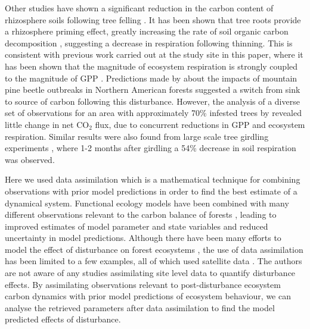 Other studies have shown a significant reduction in the carbon content of rhizosphere soils following tree felling \citep{Hernesmaa2005777}. It has been shown that tree roots provide a rhizosphere priming effect, greatly increasing the rate of soil organic carbon decomposition \citep{ELE:ELE1095}, suggesting a decrease in respiration following thinning. This is consistent with previous work carried out at the study site in this paper, where it has been shown that the magnitude of ecosystem respiration is strongly coupled to the magnitude of GPP \citep{heinemeyer2012exploring}. Predictions made by \citet{kurz2008mountain} about the impacts of mountain pine beetle outbreaks in Northern American forests suggested a switch from sink to source of carbon following this disturbance. However, the analysis of a diverse set of observations for an area with approximately 70\% infested trees by \citet{ELE:ELE12097} revealed little change in net CO\(_{2}\) flux, due to concurrent reductions in GPP and ecosystem respiration. Similar results were also found from large scale tree girdling experiments \citep{hogberg2001large}, where 1-2 months after girdling a 54\% decrease in soil respiration was observed.

Here we used data assimilation which is a mathematical technique for combining observations with prior model predictions in order to find the best estimate of a dynamical system. Functional ecology models have been combined with many different observations relevant to the carbon balance of forests \citep{Quaife2008, fox2009reflex, zobitz2011primer, richardson2010estimating, Zobitz2014, Niu2014, Pinnington2016299}, leading to improved estimates of model parameter and state variables and reduced uncertainty in model predictions. Although there have been many efforts to model the effect of disturbance on forest ecosystems \citep{thornton2002modeling, seidl2011modelling}, the use of data assimilation has been limited to a few examples, all of which used satellite data \citep{hilker2009new, kantzas2015improving}. The authors are not aware of any studies assimilating site level data to quantify disturbance effects. By assimilating observations relevant to post-disturbance ecosystem carbon dynamics with prior model predictions of ecosystem behaviour, we can analyse the retrieved parameters after data assimilation to find the model predicted effects of disturbance.   

